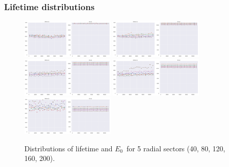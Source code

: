 \begin{frame}
\frametitle{Lifetime distributions}
\begin{figure}
  \begin{center}
      \includegraphics[width=0.4\textwidth]{img/r6581/R_phi_lt1.png}
      \includegraphics[width=0.4\textwidth]{img/r6581/R_phi_lt2.png} \\
      \includegraphics[width=0.4\textwidth]{img/r6581/R_phi_lt3.png}
      \includegraphics[width=0.4\textwidth]{img/r6581/R_phi_lt4.png}\\
      \includegraphics[width=0.4\textwidth]{img/r6581/R_phi_lt5.png}
    \caption{Distributions of lifetime and $E_0$~for 5 radial sectors (40, 80, 120, 160, 200).}
  \end{center}
\end{figure}
\end{frame}

